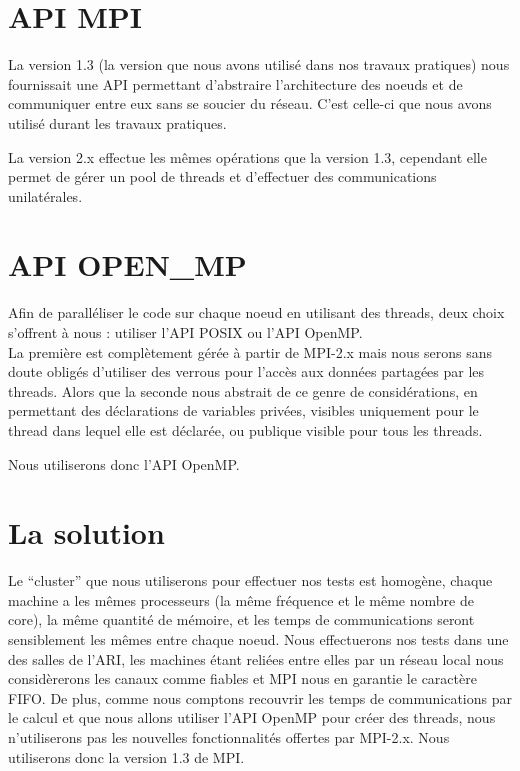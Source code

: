 \section{API MPI}
\par La version 1.3 (la version que nous avons utilisé dans nos travaux pratiques)
nous fournissait une API permettant d'abstraire 
l'architecture des noeuds et de communiquer entre eux sans se soucier du réseau. C'est
celle-ci que nous avons utilisé durant les travaux pratiques.\\

\par La version 2.x effectue les mêmes opérations que la version 1.3,
cependant elle permet de gérer un pool de threads et d'effectuer des communications unilatérales.\\

\section{API OPEN\_MP}
\par Afin de paralléliser le code sur chaque noeud en utilisant des threads,
deux choix s'offrent à nous : utiliser l'API POSIX ou l'API OpenMP.\\
La première est complètement gérée à partir de MPI-2.x mais nous serons sans doute
obligés d'utiliser des verrous pour l'accès aux données partagées par les threads.
Alors que la seconde nous abstrait de ce genre de considérations, en permettant 
des déclarations de variables privées, visibles uniquement pour le thread dans lequel elle est déclarée, 
ou publique visible pour tous les threads.\\

\par Nous utiliserons donc l'API OpenMP.\\

\section{La solution}
\par Le ``cluster'' que nous utiliserons pour effectuer nos tests 
est homogène, chaque machine a les mêmes processeurs (la même fréquence et le même nombre de core),
la même quantité de mémoire, et les temps de communications seront sensiblement 
les mêmes entre chaque noeud. Nous effectuerons nos tests dans une des salles 
de l'ARI, les machines étant reliées entre elles par un réseau local nous considèrerons 
les canaux comme fiables et MPI nous en garantie le caractère FIFO.
De plus, comme nous comptons recouvrir les temps
de communications par le calcul et que nous allons utiliser l'API OpenMP 
pour créer des threads, nous n'utiliserons pas les nouvelles fonctionnalités offertes
par MPI-2.x. Nous utiliserons donc la version 1.3 de MPI.\\


